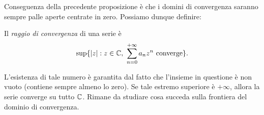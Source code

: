 \documentclass[Completo.tex]{subfiles}
\begin{document}
Conseguenza della precedente proposizione è che i domini di convergenza saranno sempre palle aperte centrate in zero. Possiamo dunque definire:
\begin{Def}
	Il \textit{raggio di convergenza} di una serie è
	\begin{equation*}
	\sup\{\vert z \vert: z \in \bb[C], \ \sum\limits_{n=0}^{+\infty} a_n z^n \ \text{converge}\}.
	\end{equation*}
\end{Def}
\begin{Oss}
	L'esistenza di tale numero è garantita dal fatto che l'insieme in questione è non vuoto (contiene sempre almeno lo zero). Se tale estremo superiore è $+\infty$, allora la serie converge su tutto $\bb[C]$. Rimane da studiare cosa succeda sulla frontiera del dominio di convergenza.
\end{Oss}
\end{document}
